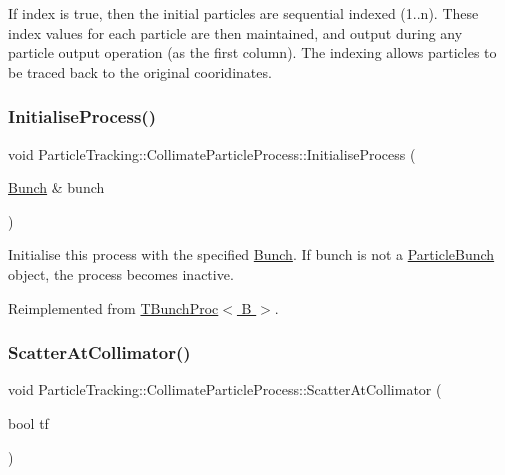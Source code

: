 If index is true, then the initial particles are sequential indexed (1..n). These index values for each particle are then maintained, and output during any particle output operation (as the first column). The indexing allows particles to be traced back to the original cooridinates. \mbox{\label{classParticleTracking_1_1CollimateParticleProcess_a884a7d80cda58ee50cdaa4ec2fb56b62}} 
\subsubsection{\texorpdfstring{Initialise\+Process()}{InitialiseProcess()}}
{\footnotesize\ttfamily void Particle\+Tracking\+::\+Collimate\+Particle\+Process\+::\+Initialise\+Process (\begin{DoxyParamCaption}\item[{\hyperlink{classBunch}{Bunch} \&}]{bunch }\end{DoxyParamCaption})\hspace{0.3cm}{\ttfamily [virtual]}}

Initialise this process with the specified \hyperlink{classBunch}{Bunch}. If bunch is not a \hyperlink{classParticleTracking_1_1ParticleBunch}{Particle\+Bunch} object, the process becomes inactive. 

Reimplemented from \hyperlink{classTBunchProc}{T\+Bunch\+Proc$<$ B $>$}.

\mbox{\label{classParticleTracking_1_1CollimateParticleProcess_a6ce4a520f7eb912bdfa635ef26614733}} 
\subsubsection{\texorpdfstring{Scatter\+At\+Collimator()}{ScatterAtCollimator()}}
{\footnotesize\ttfamily void Particle\+Tracking\+::\+Collimate\+Particle\+Process\+::\+Scatter\+At\+Collimator (\begin{DoxyParamCaption}\item[{bool}]{tf }\end{DoxyParamCaption})\hspace{0.3cm}{\ttfamily [inline]}}

